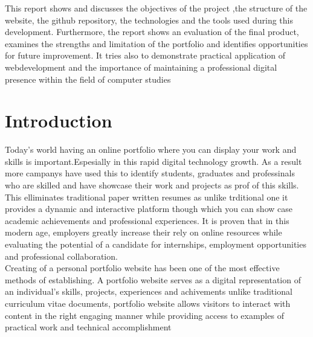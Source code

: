 \documentclass[10pt, titlepage, oneside, a4paper]{article}
\begin{document}
This report shows and discusses the objectives of the project ,the structure of the website, the github repository, the technologies and the tools used during this development. Furthermore, the report shows an evaluation of the final product, examines the strengths and limitation of the portfolio and identifies opportunities for future improvement. It tries also to demonstrate practical application of webdevelopment and the importance of maintaining a professional digital presence within the field of computer studies \\



\section{Introduction}
Today's world having an online portfolio where you can display your work and skills is important.Espesially in this rapid  digital technology growth. As a result more campanys have used this to identify students, graduates and professinals who are skilled and have showcase their work and projects as prof of this skills. This elliminates traditional paper written resumes as unlike trditional one it provides a dynamic and interactive platform though which you can show case academic achievements and professional experiences. It is proven that in this modern age, employers greatly increase their rely on online resources while evaluating the potential of a candidate for internships, employment opportunities and professional collaboration. \\



Creating of a personal portfolio website has been one of the most effective methods of establishing. A portfolio website serves as a digital representation of an individual's skills, projects, experiences and achivements unlike traditional curriculum vitae documents, portfolio website allows visitors to interact with content in the right engaging manner while providing access to examples of practical work and technical accomplishment \\
\end{document}
